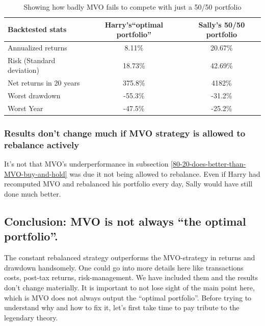 \documentclass[a4paper]{article}
\begin{document}
\begin{table}[h!]
	\centering
	\begin{tabular}{l c c}
		\rowcolor{header}
		\hline
		Backtested stats &
		Harry’s“optimal portfolio” &
		Sally’s 50/50 portfolio \\
		\hline
		Annualized returns & 8.11\% & 20.67\% \\
		Risk (Standard deviation) & 18.73\% & 42.69\% \\
		Net returns in 20 years & 375.8\% & 4182\% \\
		Worst drawdown & -55.3\% & -31.2\% \\
		Worst Year & -47.5\% & -25.2\% \\
	\end{tabular}
	\caption{\label{tab:mvo-oracle-50-50}Showing how badly MVO fails to compete with just a 50/50 portfolio}
\end{table}

\subsubsection{\label{buy-and-hold-not-culprit}Results don't change much if MVO strategy is allowed to rebalance actively}
It's not that MVO's underperformance in subsection \ref{80-20-does-better-than-MVO-buy-and-hold} was due it not being allowed to rebalance. Even if Harry had recomputed MVO and rebalanced his portfolio every day, Sally would have still done much better.

\subsection{Conclusion: MVO is not always “the optimal portfolio”.}
The constant rebalanced strategy outperforms the MVO-strategy in returns and drawdown handsomely. One could go into more details here like transactions costs, post-tax returns, risk-management. We have included them and the results don’t change materially. It is important to not lose sight of the main point here, which is MVO does not always output the “optimal portfolio”.  Before trying to understand why and how to fix it, let’s first take time to pay tribute to the legendary theory.
\end{document}
